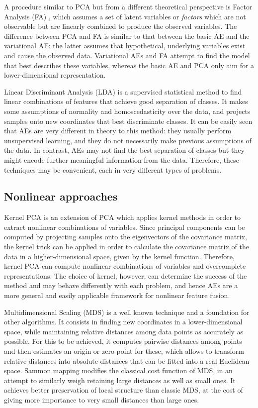 A procedure similar to PCA but from a different theoretical perspective is Factor Analysis (FA) , which assumes a set of latent variables or \textit{factors} which are not observable but are linearly combined to produce the observed variables. The difference between PCA and FA is similar to that between the basic AE and the variational AE: the latter assumes that hypothetical, underlying variables exist and cause the observed data. Variational AEs and FA attempt to find the model that best describes these variables, whereas the basic AE and PCA only aim for a lower-dimensional representation.

Linear Discriminant Analysis (LDA)  is a supervised statistical method to find linear combinations of features that achieve good separation of classes. It makes some assumptions of normality and homoscedasticity over the data, and projects samples onto new coordinates that best discriminate classes. It can be easily seen that AEs are very different in theory to this method: they usually perform unsupervised learning, and they do not necessarily make previous assumptions of the data. In contrast, AEs may not find the best separation of classes but they might encode further meaningful information from the data. Therefore, these techniques may be convenient, each in very different types of problems.

\subsection{Nonlinear approaches}

Kernel PCA  is an extension of PCA which applies kernel methods in order to extract nonlinear combinations of variables. Since principal components can be computed by projecting samples onto the eigenvectors of the covariance matrix, the kernel trick can be applied in order to calculate the covariance matrix of the data in a higher-dimensional space, given by the kernel function. Therefore, kernel PCA can compute nonlinear combinations of variables and overcomplete representations. The choice of kernel, however, can determine the success of the method and may behave differently with each problem, and hence AEs are a more general and easily applicable framework for nonlinear feature fusion.

Multidimensional Scaling (MDS)  is a well known technique and a foundation for other algorithms. It consists in finding new coordinates in a lower-dimensional space, while maintaining relative distances among data points as accurately as possible. For this to be achieved, it computes pairwise distances among points and then estimates an origin or zero point for these, which allows to transform relative distances into absolute distances that can be fitted into a real Euclidean space. Sammon mapping  modifies the classical cost function of MDS, in an attempt to similarly weigh retaining large distances as well as small ones. It achieves better preservation of local structure than classic MDS, at the cost of giving more importance to very small distances than large ones.  

